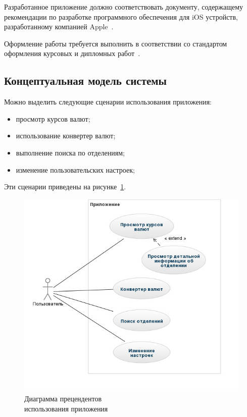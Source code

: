 Разработанное приложение должно соответствовать документу,
содержащему рекомендации по разработке программного обеспечения для
iOS устройств, разработанному компанией Apple~\cite{ios_hig}.

Оформление работы требуется выполнить в соответствии
со стандартом оформления курсовых и дипломных работ~\cite{stp2013}.


\pagebreak
\subsection{Концептуальная модель системы}

Можно выделить следующие сценарии использования приложения:
\begin{itemize}
  \item просмотр курсов валют;
  \item использование конвертер валют;
  \item выполнение поиска по отделениям;
  \item изменение пользовательских настроек;
\end{itemize}

Эти сценарии приведены на рисунке~\ref{fig:use_case}.

\begin{figure}[h!]
  \centering
  \includegraphics[width=140mm]{pic/use_case}
  \caption{Диаграмма прецендентов \\ использования приложения}
  \label{fig:use_case}
\end{figure}

